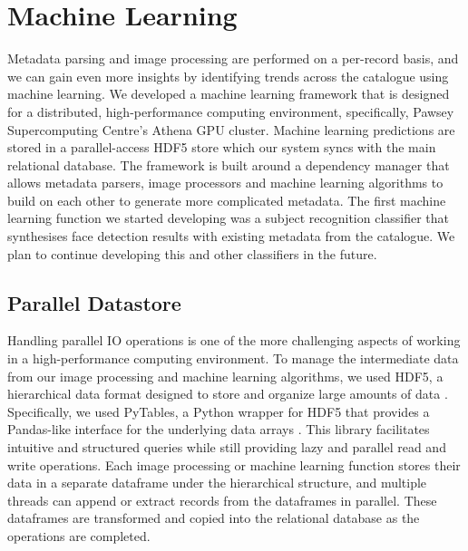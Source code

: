 \documentclass[10pt, a4paper]{article}
\begin{document}
\section{Machine Learning}
\label{section:machine_learning}

\label{subsection:machine_learning:introduction}
Metadata parsing and image processing are performed on a per-record basis, and we can gain even more insights by identifying trends across the catalogue using machine learning. We developed a machine learning framework that is designed for a distributed, high-performance computing environment, specifically, Pawsey Supercomputing Centre’s Athena GPU cluster. Machine learning predictions are stored in a parallel-access HDF5 store which our system syncs with the main relational database. The framework is built around a dependency manager that allows metadata parsers, image processors and machine learning algorithms to build on each other to generate more complicated metadata. The first machine learning function we started developing was a subject recognition classifier that synthesises face detection results with existing metadata from the catalogue. We plan to continue developing this and other classifiers in the future.

\subsection{Parallel Datastore}
\label{subsection:machine_learning:parallel_datastore}
Handling parallel IO operations is one of the more challenging aspects of working in a high-performance computing environment. To manage the intermediate data from our image processing and machine learning algorithms, we used HDF5, a hierarchical data format designed to store and organize large amounts of data \cite{hdf5}. Specifically, we used PyTables, a Python wrapper for HDF5 that provides a Pandas-like interface for the underlying data arrays \cite{pytables}. This library facilitates intuitive and structured queries  while still providing lazy and parallel read and write operations. Each image processing or machine learning function stores their data in a separate dataframe under the hierarchical structure, and multiple threads can append or extract records from the dataframes in parallel. These dataframes are transformed and copied into the relational database as the operations are completed.
\end{document}
